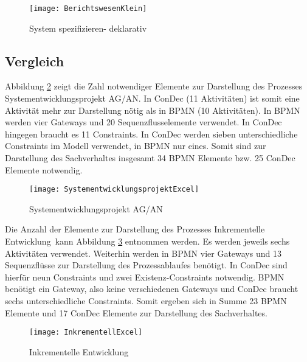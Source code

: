 {\begin{figure}[!htbp]
\begin{center}
  \texttt{[image: BerichtswesenKlein]} %
  \caption{System spezifizieren- deklarativ}
  \label{fig:BerichtswesenKlein}
\end{center}
\end{figure}

\clearpage

\subsection{Vergleich}


Abbildung \ref{fig:SystementwicklungsprojektExcel} zeigt die Zahl notwendiger Elemente zur Darstellung des Prozesses \grqq Systementwicklungsprojekt AG/AN\grqq. In ConDec (11 Aktivitäten) ist somit eine Aktivität mehr zur Darstellung nötig als in BPMN (10 Aktivitäten). In BPMN werden vier Gateways und 20 Sequenzflusselemente verwendet. In ConDec hingegen braucht es 11 Constraints. In ConDec werden sieben unterschiedliche Constraints im Modell verwendet, in BPMN nur eines. Somit sind zur Darstellung des Sachverhaltes insgesamt 34 BPMN Elemente bzw. 25 ConDec Elemente notwendig.\newline

\begin{figure}[!htbp]
\begin{center}
  \texttt{[image: SystementwicklungsprojektExcel]} %
  \caption{Systementwicklungsprojekt AG/AN}
  \label{fig:SystementwicklungsprojektExcel}
\end{center}
\end{figure}

Die Anzahl der Elemente zur Darstellung des Prozesses \grqq Inkrementelle Entwicklung\grqq \ kann Abbildung \ref{fig:InkrementellExcel} entnommen werden. Es werden jeweils sechs Aktivitäten verwendet. Weiterhin werden in BPMN vier Gateways und 13 Sequenzflüsse zur Darstellung des Prozessablaufes benötigt. In ConDec sind hierfür neun Constraints und zwei Existenz-Constraints notwendig. BPMN benötigt ein Gateway, also keine verschiedenen Gateways und ConDec braucht sechs unterschiedliche Constraints. Somit ergeben sich in Summe 23 BPMN Elemente und 17 ConDec Elemente zur Darstellung des Sachverhaltes. \newline

\begin{figure}[!htbp]
\begin{center}
  \texttt{[image: InkrementellExcel]} %
  \caption{Inkrementelle Entwicklung}
  \label{fig:InkrementellExcel}
\end{center}
\end{figure}

}
